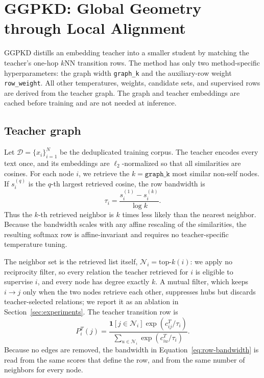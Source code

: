\section{GGPKD: Global Geometry through Local Alignment}
\label{sec:method}

GGPKD distills an embedding teacher into a smaller student by matching the
teacher's one-hop $k$NN transition rows. The method has only two
method-specific hyperparameters: the graph width \texttt{graph\_k} and the
auxiliary-row weight \texttt{row\_weight}. All other temperatures, weights,
candidate sets, and supervised rows are derived from the teacher graph. The
graph and teacher embeddings are cached before training and are not needed at
inference.

\subsection{Teacher graph}
\label{sec:graph}

Let $\mathcal D=\{x_i\}_{i=1}^{N}$ be the deduplicated training corpus. The
teacher encodes every text once, and its embeddings are $\ell_2$-normalized so
that all similarities are cosines. For each node $i$, we retrieve the
$k=\texttt{graph\_k}$ most similar non-self nodes. If $s_i^{(q)}$ is the
$q$-th largest retrieved cosine, the row bandwidth is
\begin{equation}
\tau_i=\frac{s_i^{(1)}-s_i^{(k)}}{\log k}.
\label{eq:row-bandwidth}
\end{equation}
Thus the $k$-th retrieved neighbor is $k$ times less likely than the nearest
neighbor. Because the bandwidth scales with any affine
rescaling of the similarities, the resulting softmax row is affine-invariant
and requires no teacher-specific temperature tuning.

The neighbor set is the retrieved list itself, $\mathcal N_i=\mathrm{top}\text{-}k(i)$:
we apply no reciprocity filter, so every relation the teacher retrieved for $i$
is eligible to supervise $i$, and every node has degree exactly $k$. A mutual
filter, which keeps $i\rightarrow j$ only when the two nodes retrieve each
other, suppresses hubs but discards teacher-selected relations; we report it as
an ablation in Section~\ref{sec:experiments}. The teacher transition row is
\begin{equation}
P_i^T(j)
=\frac{\mathbf 1[j\in\mathcal N_i]\exp(c_{ij}^T/\tau_i)}
{\sum_{u\in\mathcal N_i}\exp(c_{iu}^T/\tau_i)}.
\label{eq:teacher-transition}
\end{equation}
Because no edges are removed, the bandwidth in
Equation~\eqref{eq:row-bandwidth} is read from the same scores that define the
row, and from the same number of neighbors for every node.

